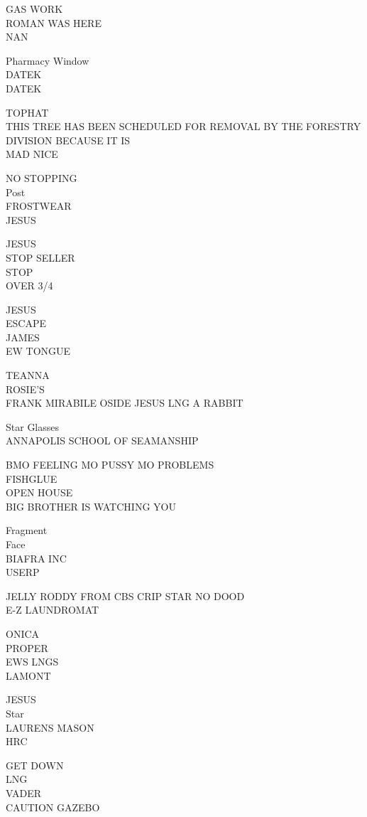 \documentclass[10pt,letterpaper]{article}
\begin{document}
GAS WORK\\
ROMAN WAS HERE\\
NAN

Pharmacy Window\\
DATEK\\
DATEK

TOPHAT\\
THIS TREE HAS BEEN SCHEDULED FOR REMOVAL BY THE FORESTRY DIVISION BECAUSE IT IS\\
MAD NICE

NO STOPPING\\
Post\\
FROSTWEAR\\
JESUS

JESUS\\
STOP SELLER\\
STOP\\
OVER 3/4

JESUS\\
ESCAPE\\
JAMES\\
EW TONGUE

TEANNA\\
ROSIE'S\\
FRANK MIRABILE OSIDE JESUS LNG A RABBIT

Star Glasses\\
ANNAPOLIS SCHOOL OF SEAMANSHIP

BMO FEELING MO PUSSY MO PROBLEMS\\
FISHGLUE\\
OPEN HOUSE\\
BIG BROTHER IS WATCHING YOU

Fragment\\
Face\\
BIAFRA INC\\
USERP

JELLY RODDY FROM CBS CRIP STAR NO DOOD\\
E{-}Z LAUNDROMAT

ONICA\\
PROPER\\
EWS LNGS\\
LAMONT

JESUS\\
Star\\
LAURENS MASON\\
HRC

GET DOWN\\
LNG\\
VADER\\
CAUTION GAZEBO
\end{document}
